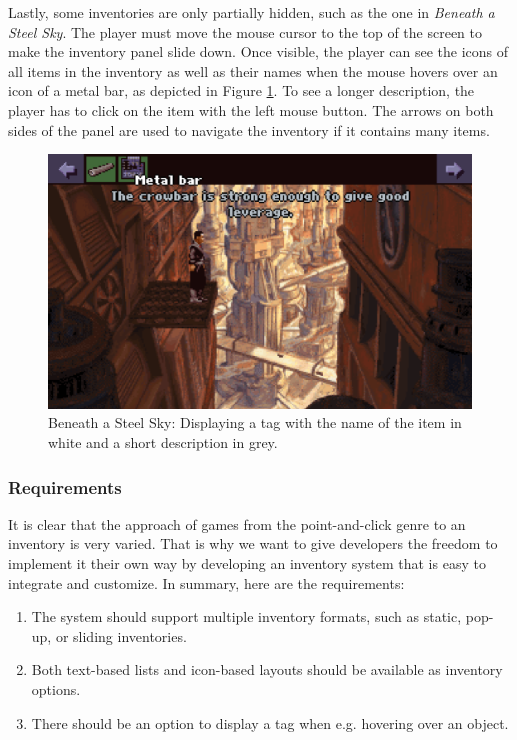 Lastly, some inventories are only partially hidden, such as the one in \textit{Beneath a Steel Sky}. The player must move the mouse cursor to the top of the screen to make the inventory panel slide down. Once visible, the player can see the icons of all items in the inventory as well as their names when the mouse hovers over an icon of a metal bar, as depicted in Figure \ref{fig:I-BaSS2}. To see a longer description, the player has to click on the item with the left mouse button. The arrows on both sides of the panel are used to navigate the inventory if it contains many items.

\begin{figure}[H]
\centering
\includegraphics[width=.75\linewidth]{img/I-BaSS2.png}
\caption{Beneath a Steel Sky: Displaying a tag with the name of the item in white and a short description in grey.}
\label{fig:I-BaSS2}
\end{figure}

\subsubsection{Requirements}
It is clear that the approach of games from the point-and-click genre to an inventory is very varied. That is why we want to give developers the freedom to implement it their own way by developing an inventory system that is easy to integrate and customize. In summary, here are the requirements:

\begin{enumerate}[label=\color{teal}\textbf{R{\arabic*}},resume]
  \item \label{intro:req:inv_formats} The system should support multiple inventory formats, such as static, pop-up, or sliding inventories.
  \item \label{intro:req:text_icon} Both text-based lists and icon-based layouts should be available as inventory options.
\item \label{intro:req:tag}  There should be an option to display a tag when e.g. hovering over an object.
\end{enumerate}

